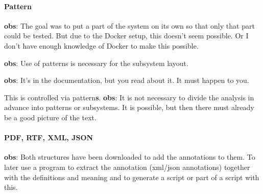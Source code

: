 \paragraph{Pattern}
\begin{obs}\label{obs:rq1-49:30-10}
    \textbf{obs}: The goal was to put a part of the system on its own so that only that part could be tested.
    But due to the Docker setup, this doesn't seem possible.
    Or I don't have enough knowledge of Docker to make this possible.
\end{obs}

\begin{obs}\label{obs:rq1-33:14-9}
    \textbf{obs}: Use of patterns is necessary for the subsystem layout.
\end{obs}

\begin{obs}\label{obs:rq1-34:14-9}
    \textbf{obs}: It's in the documentation, but you read about it.
    It must happen to you.
\end{obs}

\begin{obs}\label{obs:rq1-38:3-10}
    This is controlled via {pattern}\textbf{s}.
    \textbf{obs}: It is not necessary to divide the analysis in advance into patterns or subsystems.
    It is possible, but then there must already be a good picture of the text.
\end{obs}

\paragraph{PDF, RTF, XML, JSON}
\begin{obs}\label{obs:rq1-24:12-9}
    \textbf{obs}: Both structures have been downloaded to add the annotations to them.
    To later use a program to extract the annotation (xml/json annotations) together with the definitions and meaning and to generate a script or part of a script with this.
\end{obs}

